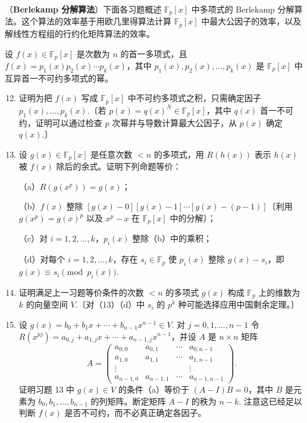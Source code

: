 \noindent（\textbf{Berlekamp 分解算法}）下面各习题概述 \(\mathbb{F}_p[x]\) 中多项式的 Berlekamp 分解算法。这个算法的效率基于用欧几里得算法计算 \(\mathbb{F}_p[x]\) 中最大公因子的效率，以及解线性方程组的行约化矩阵算法的效率。

\noindent 设 \(f(x) \in \mathbb{F}_p[x]\) 是次数为 \(n\) 的首一多项式，且 \(f(x) = p_1(x)p_2(x)\cdots p_k(x)\)，其中 \(p_1(x), p_2(x), \ldots, p_k(x)\) 是 \(\mathbb{F}_p[x]\) 中互异首一不可约多项式的幂。

\begin{enumerate}
\setcounter{enumi}{11}
\item 证明为把 \(f(x)\) 写成 \(\mathbb{F}_p[x]\) 中不可约多项式之积，只需确定因子 \(p_1(x), \ldots, p_k(x)\).〔若 \(p(x) = q(x)^N \in \mathbb{F}_p[x]\)，其中 \(q(x)\) 首一不可约，证明可以通过检查 \(p\) 次幂并与导数计算最大公因子，从 \(p(x)\) 确定 \(q(x)\).〕

\item 设 \(g(x) \in \mathbb{F}_p[x]\) 是任意次数 \(< n\) 的多项式，用 \(R(h(x))\) 表示 \(h(x)\) 被 \(f(x)\) 除后的余式。证明下列命题等价：

（a）\(R(g(x^p)) = g(x)\)；

（b）\(f(x)\) 整除 \([g(x)-0][g(x)-1]\cdots[g(x)-(p-1)]\)〔利用 \(g(x^p) = g(x)^p\) 以及 \(x^p-x\) 在 \(\mathbb{F}_p[x]\) 中的分解〕；

（c）对 \(i = 1, 2, \ldots, k\)，\(p_i(x)\) 整除（b）中的乘积；

（d）对每个 \(i = 1, 2, \ldots, k\)，存在 \(s_i \in \mathbb{F}_p\) 使 \(p_i(x)\) 整除 \(g(x)-s_i\)，即 \(g(x) \equiv s_i \pmod{p_i(x)}\).

\item 证明满足上一习题等价条件的次数 \(< n\) 的多项式 \(g(x)\) 构成 \(\mathbb{F}_p\) 上的维数为 \(k\) 的向量空间 \(V\).〔对（13）（d）中 \(s_i\) 的 \(p^k\) 种可能选择应用中国剩余定理。〕

\item 设 \(g(x) = b_0+b_1x+\cdots+b_{n-1}x^{n-1} \in V\). 对 \(j = 0, 1, \ldots, n-1\) 令 \(R(x^{pj}) = a_{0,j}+a_{1,j}x+\cdots+a_{n-1,j}x^{n-1}\)，并设 \(A\) 是 \(n \times n\) 矩阵
\[
A = \begin{pmatrix} a_{0,0} & a_{0,1} & \cdots & a_{0,n-1} \\ a_{1,0} & a_{1,1} & \cdots & a_{1,n-1} \\ \vdots & & & \vdots \\ a_{n-1,0} & a_{n-1,1} & \cdots & a_{n-1,n-1} \end{pmatrix}.
\]
证明习题 13 中 \(g(x) \in V\) 的条件（a）等价于 \((A-I)B = 0\)，其中 \(B\) 是元素为 \(b_0, b_1, \ldots, b_{n-1}\) 的列矩阵。断定矩阵 \(A-I\) 的秩为 \(n-k\). 注意这已经足以判断 \(f(x)\) 是否不可约，而不必真正确定各因子。


\end{enumerate}
